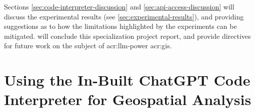 \begin{comment}
In this section it is important to include a discussion of not just the merits of the work conducted, but also the limitations.
Which choices did you make? Why? What alternatives were there?
{\color{red}\textbf{Note that a key part of the Master's Thesis grading is based on the student's ability to discuss the results in light of the work by others as well as the restrictions and potential of the work itself.}}
While the Results section will report the outcome of each specific experiments, the Discussion should put those results into perspective and look at overall lessons that can be learned from the entire series of experiments.

You should be able to discuss your work in relation to its overall goal and your research questions (i.e., those introduced in Chapter~\ref{cha:introduction}),
but also address issues such as any ethical considerations that the work may entail,
as well as its technical challenges and limitations.

Discussion and evaluation can either be two different chapters, a joint chapter (as here), or part of the concluding chapter
--- or the discussion can be part of that chapter while the evaluation is part of the experimental chapter.

As for most parts of the thesis, it is possible to select various outlines and setups for the discussion; the important thing is that all the relevant parts appear \textit{somewhere\/} in the text.
\end{comment}


Sections \autoref{sec:code-interpreter-discussion} and \autoref{sec:api-access-discussion} will discuss the experimental results (see \autoref{sec:experimental-results}), and providing suggestions as to how the limitations highlighted by the experiments can be mitigated.  will conclude this specialization project report, and provide directives for future work on the subject of \acrshort{acr:llm}-power \acrshort{acr:gis}.

\section{Using the In-Built ChatGPT Code Interpreter for Geospatial Analysis}\label{sec:code-interpreter-discussion}

